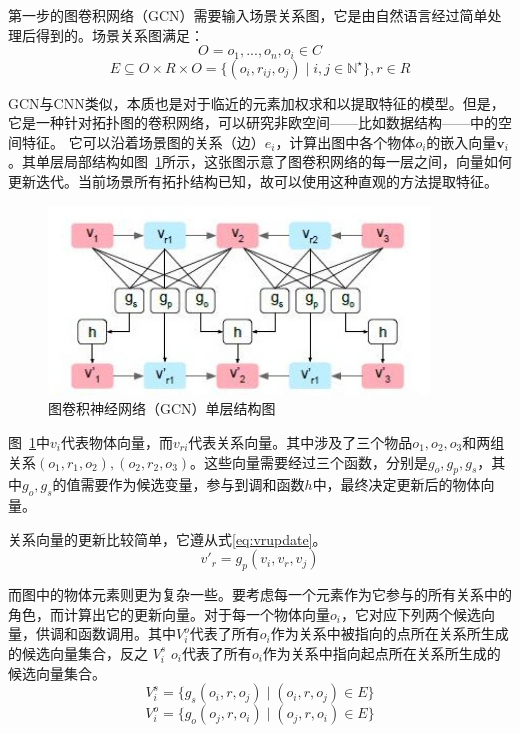 \vspace{2em}
第一步的图卷积网络（GCN）需要输入场景关系图，它是由自然语言经过简单处理后得到的。场景关系图满足：
$$O={o_1,...,o_n},o_i \in C$$
$$E \subseteq O \times R \times O =\{(o_i,r_{ij},o_j)\mid i,j \in \mathbb{N}^\star\}, r \in R$$

GCN与CNN类似，本质也是对于临近的元素加权求和以提取特征的模型。但是，它是一种针对拓扑图的卷积网络，可以研究非欧空间——比如数据结构——中的空间特征。
它可以沿着场景图的关系（边）$e_i$，计算出图中各个物体$o_i$的嵌入向量$ \textbf{v}_i$。其单层局部结构如图~\ref{fig:gcn}所示，这张图示意了图卷积网络的每一层之间，向量如何更新迭代。当前场景所有拓扑结构已知，故可以使用这种直观的方法提取特征。

\begin{figure}[!htb]
    \centering
    \includegraphics[width=0.9\textwidth]{figures/gcn.png}
    \caption{图卷积神经网络（GCN）单层结构图}
    \label{fig:gcn}
\end{figure}
图~\ref{fig:gcn}中$v_i$代表物体向量，而$v_{ri}$代表关系向量。其中涉及了三个物品$o_1, o_2, o_3$和两组关系$(o_1,r_1,o_2), (o_2,r_2,o_3)$。这些向量需要经过三个函数，分别是$g_o, g_p, g_s$，其中$g_o, g_s$的值需要作为候选变量，参与到调和函数$h$中，最终决定更新后的物体向量。

关系向量的更新比较简单，它遵从式\eqref{eq:vrupdate}。
\begin{equation}
    v'_r = g_p(v_i,v_r,v_j)
    \label{eq:vrupdate}
\end{equation}

而图中的物体元素则更为复杂一些。要考虑每一个元素作为它参与的所有关系中的角色，而计算出它的更新向量。对于每一个物体向量$o_i$，它对应下列两个候选向量，供调和函数调用。其中$V_i^o $代表了所有$o_i$作为关系中被指向的点所在关系所生成的候选向量集合，反之 $V_i^s$ $o_i$代表了所有$o_i$作为关系中指向起点所在关系所生成的候选向量集合。
$$V_i^s = \{g_s(o_i, r, o_j)\mid (o_i, r, o_j)\in E\}$$
$$V_i^o = \{g_o(o_j, r, o_i)\mid (o_j, r, o_i)\in E\}$$

